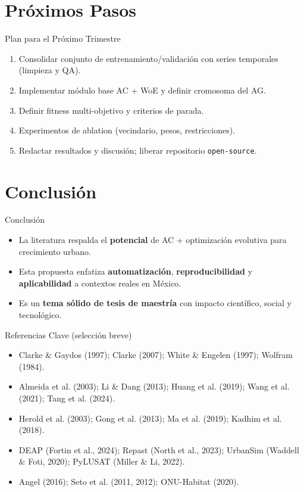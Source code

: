 \documentclass[aspectratio=169]{beamer}
\begin{document}
\section{Próximos Pasos}
\begin{frame}{Plan para el Próximo Trimestre}
  \begin{enumerate}
    \item Consolidar conjunto de entrenamiento/validación con series temporales (limpieza y QA).
    \item Implementar módulo base AC + WoE y definir cromosoma del AG.
    \item Definir fitness multi-objetivo y criterios de parada.
    \item Experimentos de ablation (vecindario, pesos, restricciones).
    \item Redactar resultados y discusión; liberar repositorio \texttt{open-source}.
  \end{enumerate}
\end{frame}

\section{Conclusión}
\begin{frame}{Conclusión}
  \begin{itemize}
    \item La literatura respalda el \textbf{potencial} de AC + optimización evolutiva para crecimiento urbano.
    \item Esta propuesta enfatiza \textbf{automatización}, \textbf{reproducibilidad} y \textbf{aplicabilidad} a contextos reales en México.
    \item Es un \textbf{tema sólido de tesis de maestría} con impacto científico, social y tecnológico.
  \end{itemize}
\end{frame}

\appendix
\begin{frame}{Referencias Clave (selección breve)}
  \footnotesize
  \begin{itemize}
    \item Clarke \& Gaydos (1997); Clarke (2007); White \& Engelen (1997); Wolfram (1984).
    \item Almeida et al. (2003); Li \& Dang (2013); Huang et al. (2019); Wang et al. (2021); Tang et al. (2024).
    \item Herold et al. (2003); Gong et al. (2013); Ma et al. (2019); Kadhim et al. (2018).
    \item DEAP (Fortin et al., 2024); Repast (North et al., 2023); UrbanSim (Waddell \& Foti, 2020); PyLUSAT (Miller \& Li, 2022).
    \item Angel (2016); Seto et al. (2011, 2012); ONU-Habitat (2020).
  \end{itemize}
\end{frame}
\end{document}
